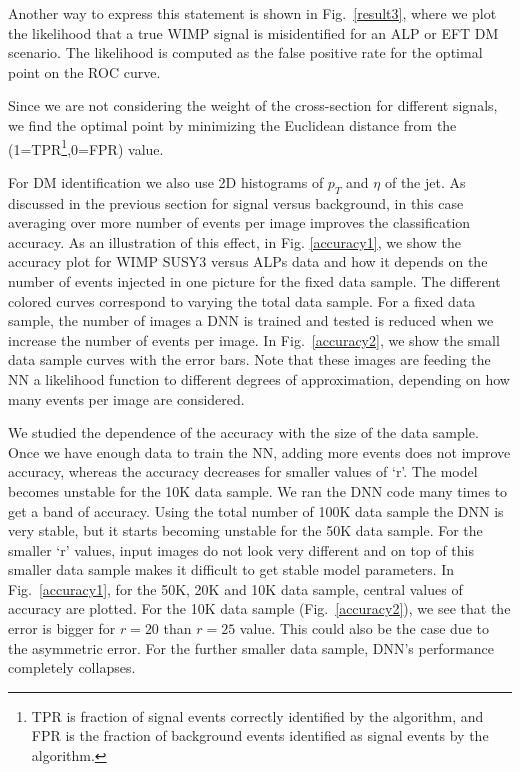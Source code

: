 \documentclass[prd,aps,letterpaper,floatfix,superscriptaddress,preprintnumbers,twocolumn,10pt,nofootinbib]{revtex4-1}
\begin{document}
Another way to express this statement is shown in Fig.~\ref{result3}, where we plot the likelihood that a true WIMP signal is misidentified for an ALP or EFT DM scenario. The likelihood is computed as the false positive rate for the optimal point on the ROC curve. 

Since we are not considering the weight of the cross-section for different signals, we find the optimal point by minimizing the Euclidean distance from the (1=\textsc{TPR}\footnote{TPR is fraction of signal events correctly identified by the algorithm, and FPR is the fraction of background events identified as signal events by the algorithm.},0=\textsc{FPR}) value. 


For DM identification we also use 2D histograms of $p_T$ and $\eta$ of the jet. As discussed in the previous section for signal versus background, in this case  averaging over more number of events per image  improves the classification accuracy. As an illustration of this effect, in Fig. \ref{accuracy1}, we show the accuracy plot for WIMP SUSY3 versus ALPs data and how it depends on the number of events injected in one picture for the fixed data sample. The different colored curves correspond to varying the total data sample. For a fixed data sample, the number of images a  DNN is trained and tested is reduced when we increase the number of events per image. In Fig.~\ref{accuracy2}, we show the small data sample curves with the error bars. Note that these images  are feeding the NN a likelihood function to different degrees of approximation, depending on how many events per image are considered. 

We studied the dependence of the  accuracy with the size of the data sample. Once we have enough data to train the NN, adding more events does not improve accuracy, whereas the accuracy decreases for smaller values of `r'. The model becomes unstable for the 10K data sample. We ran the DNN code many times to get a band of accuracy. Using the total number of 100K data sample the DNN is very stable, but it starts becoming unstable for the 50K data sample. For the smaller `r' values, input images do not look very different and on top of this smaller data sample makes it difficult to get stable model parameters. In Fig.~\ref{accuracy1}, for the 50K, 20K and 10K data sample, central values of accuracy are plotted. For the 10K data sample (Fig.~\ref{accuracy2}), we see that the error is bigger for $r=20$ than $r=25$ value. This could also be the case due to the asymmetric error. For the further smaller data sample, DNN's performance completely collapses.
\end{document}
